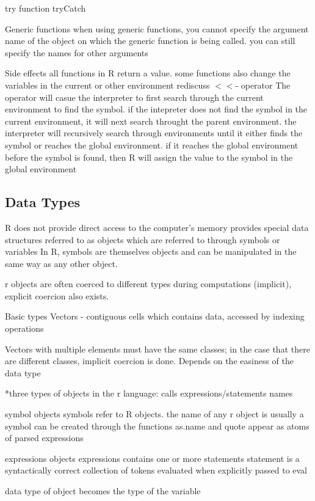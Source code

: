 \documentclass[12pt]{article}
\begin{document}
try function
tryCatch

Generic functions
when using generic functions, you cannot specify the argument name of the object on which the generic function is being called. you can still specify the names for other arguments


Side effects
all functions in R return a value. some functions also change the variables in the current or other environment
rediscuss \(<<\)- operator
The operator will casue the interpreter to first search through the current environment to find the symbol. if the intepreter does not find the symbol in the current environment, it will next search throught the parent environment. the interpreter will recursively search through environments until it either finds the symbol or reaches the global environment. if it reaches the global environment before the symbol is found, then R will assign the value to the symbol in the global environment


\iffalse
\subsection{Data Types}
R does not provide direct access to the computer's memory
provides special data structures referred to as objects
which are referred to through symbols or variables
In R, symbols are themselves objects and can be manipulated in the same way as any other object.

r objects are often coerced to different types during computations (implicit), explicit coercion also exists.

Basic types
Vectors - contiguous cells which contains data, accessed by indexing operations

Vectors with multiple elements must have the same classes; in the case that there are different classes, implicit coercion is done. Depends on the easiness of the data type

*three types of objects in the r language:
calls
expressions/statements
names

symbol objects
symbols refer to R objects. the name of any r object is usually a symbol
can be created through the functions as.name and quote
appear as atoms of parsed expressions

expressions objects
expressions contains one or more statements
statement is a syntactically correct collection of tokens
evaluated when explicitly passed to eval

data type of object becomes the type of the variable
\end{document}
